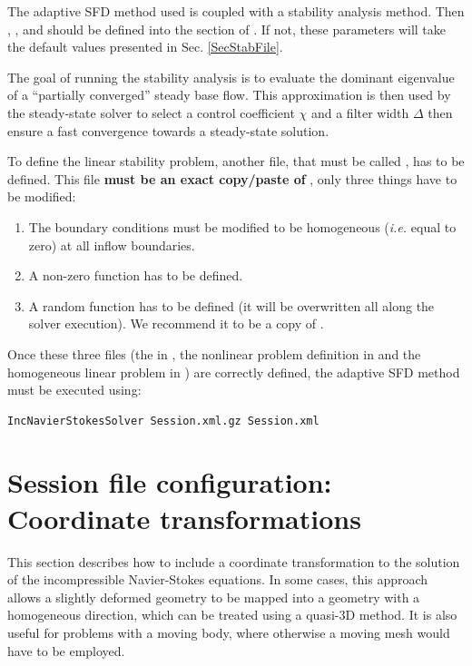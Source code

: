 The adaptive SFD method used is coupled with a stability analysis method. Then , ,  and  should be defined into the  section of . If not, these parameters will take the default values presented in Sec. \ref{SecStabFile}.

The goal of running the stability analysis is to evaluate the dominant eigenvalue of a ``partially converged'' steady base flow. This approximation is then used by the steady-state solver to select a control coefficient $\chi$ and a filter width $\Delta$ then ensure a fast convergence towards a steady-state solution.

To define the linear stability problem, another file, that must be called , has to be defined. This file \textbf{must be an exact copy/paste of} , only three things have to be modified:
\begin{enumerate}
\item The boundary conditions must be modified to be homogeneous (\textit{i.e.} equal to zero) at all inflow boundaries.
\item A non-zero function  has to be defined.
\item A random function  has to be defined (it will be overwritten all along the solver execution). We recommend it to be a copy of .
\end{enumerate}

Once these three files (the   in , the nonlinear problem definition in  and the homogeneous linear problem in ) are correctly defined, the adaptive SFD method must be executed using:

\begin{lstlisting}[style=BashInputStyle]
IncNavierStokesSolver Session.xml.gz Session.xml
\end{lstlisting}


\section{Session file configuration: Coordinate transformations}
\label{sec:mapping}

This section describes how to include a coordinate transformation
to the solution of the incompressible Navier-Stokes equations.
In some cases, this approach allows a slightly deformed geometry to
be mapped into a geometry with a homogeneous direction, which can be treated
using a quasi-3D method. It is also useful for problems with a moving body,
 where otherwise a moving mesh would have to be employed.
 
